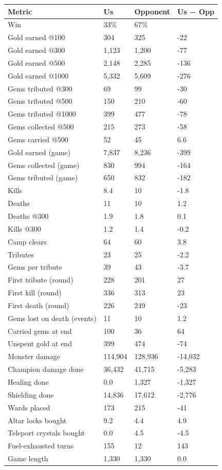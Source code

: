 \documentclass[
  10pt,
]{article}
\newcounter{none} %
\begin{document}
{\def\LTcaptype{none} %
\begin{longtable}[]{@{}llll@{}}
\toprule\noalign{}
Metric & Us & Opponent & Us − Opp \\
\midrule\noalign{}
\endhead
\bottomrule\noalign{}
\endlastfoot
Win & 33\% & 67\% & \\
Gold earned @100 & 304 & 325 & -22 \\
Gold earned @300 & 1,123 & 1,200 & -77 \\
Gold earned @500 & 2,148 & 2,285 & -136 \\
Gold earned @1000 & 5,332 & 5,609 & -276 \\
Gems tributed @300 & 69 & 99 & -30 \\
Gems tributed @500 & 150 & 210 & -60 \\
Gems tributed @1000 & 399 & 477 & -78 \\
Gems collected @500 & 215 & 273 & -58 \\
Gems carried @500 & 52 & 45 & 6.6 \\
Gold earned (game) & 7,837 & 8,236 & -399 \\
Gems collected (game) & 830 & 994 & -164 \\
Gems tributed (game) & 650 & 832 & -182 \\
Kills & 8.4 & 10 & -1.8 \\
Deaths & 11 & 10 & 1.2 \\
Deaths @300 & 1.9 & 1.8 & 0.1 \\
Kills @300 & 1.2 & 1.4 & -0.2 \\
Camp clears & 64 & 60 & 3.8 \\
Tributes & 23 & 25 & -2.2 \\
Gems per tribute & 39 & 43 & -3.7 \\
First tribute (round) & 228 & 201 & 27 \\
First kill (round) & 336 & 313 & 23 \\
First death (round) & 226 & 249 & -23 \\
Gems lost on death (events) & 11 & 10 & 1.2 \\
Carried gems at end & 100 & 36 & 64 \\
Unspent gold at end & 399 & 474 & -74 \\
Monster damage & 114,904 & 128,936 & -14,032 \\
Champion damage done & 36,432 & 41,715 & -5,283 \\
Healing done & 0.0 & 1,327 & -1,327 \\
Shielding done & 14,836 & 17,612 & -2,776 \\
Wards placed & 173 & 215 & -41 \\
Altar locks bought & 9.2 & 4.4 & 4.9 \\
Teleport crystals bought & 0.0 & 4.5 & -4.5 \\
Fuel-exhausted turns & 155 & 12 & 143 \\
Game length & 1,330 & 1,330 & 0.0 \\
\end{longtable}
}
\end{document}
